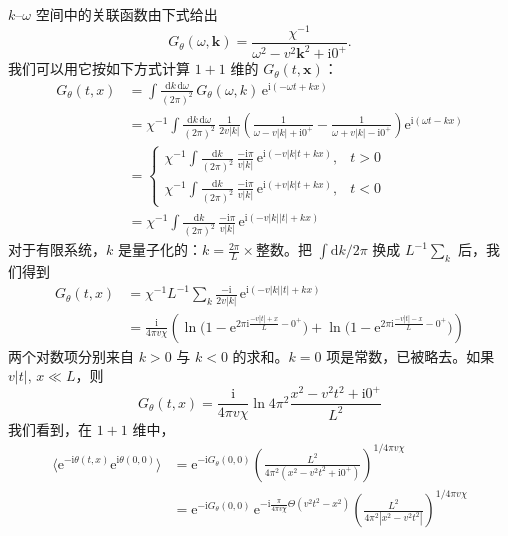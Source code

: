 $k$--$\omega$ 空间中的关联函数由下式给出
\begin{equation*}
G_{\theta}(\omega,\pmb{k})=\frac{\chi^{-1}}{\omega^2-v^2\pmb{k}^2+\mathrm{i}0^+}.
\end{equation*}
我们可以用它按如下方式计算 $1+1$ 维的 $G_{\theta}(t,\pmb{x})$：
\begin{align*}
G_{\theta}(t,x)&=\int\frac{\mathrm{d}k\,\mathrm{d}\omega}{(2\pi)^2}\,G_{\theta}(\omega,k)\,\mathrm{e}^{\mathrm{i}(-\omega t+kx)}\\
&=\chi^{-1}\int\frac{\mathrm{d}k\,\mathrm{d}\omega}{(2\pi)^2}\,\frac{1}{2v|k|}\left(\frac{1}{\omega-v|k|+\mathrm{i}0^+}-\frac{1}{\omega+v|k|-\mathrm{i}0^+}\right)\mathrm{e}^{\mathrm{i}(\omega t-kx)}\\
&=\left\{\begin{array}{ll}
\chi^{-1}\displaystyle\int\frac{\mathrm{d}k}{(2\pi)^2}\,\frac{-\mathrm{i}\pi}{v|k|}\,\mathrm{e}^{\mathrm{i}(-v|k|t+kx)}, & t>0\\[10pt]
\chi^{-1}\displaystyle\int\frac{\mathrm{d}k}{(2\pi)^2}\,\frac{-\mathrm{i}\pi}{v|k|}\,\mathrm{e}^{\mathrm{i}(+v|k|t+kx)}, & t<0
\end{array}\right.\\
&=\chi^{-1}\int\frac{\mathrm{d}k}{(2\pi)^2}\,\frac{-\mathrm{i}\pi}{v|k|}\,\mathrm{e}^{\mathrm{i}(-v|k||t|+kx)}
\end{align*}
对于有限系统，$k$ 是量子化的：$k=\frac{2\pi}{L}\times\text{整数}$。把 $\int\mathrm{d}k/2\pi$ 换成 $L^{-1}\sum_k$ 后，我们得到
\begin{align*}
G_{\theta}(t,x)&=\chi^{-1}L^{-1}\sum_k\frac{-\mathrm{i}}{2v|k|}\,\mathrm{e}^{\mathrm{i}(-v|k||t|+kx)}\\
&=\frac{\mathrm{i}}{4\pi v\chi}\left(\ln\big(1-\mathrm{e}^{2\pi\mathrm{i}\frac{-v|t|+x}{L}-0^+}\big)+\ln\big(1-\mathrm{e}^{2\pi\mathrm{i}\frac{-v|t|-x}{L}-0^+}\big)\right)
\end{align*}
两个对数项分别来自 $k>0$ 与 $k<0$ 的求和。$k=0$ 项是常数，已被略去。如果 $v|t|,\,x\ll L$，则
\begin{equation*}
G_{\theta}(t,x)=\frac{\mathrm{i}}{4\pi v\chi}\ln 4\pi^2\frac{x^2-v^2t^2+\mathrm{i}0^+}{L^2} \tag{3.3.24}
\end{equation*}
我们看到，在 $1+1$ 维中，
\begin{align*}
\big\langle\mathrm{e}^{-\mathrm{i}\theta(t,x)}\mathrm{e}^{\mathrm{i}\theta(0,0)}\big\rangle&=\mathrm{e}^{-\mathrm{i}G_{\theta}(0,0)}\left(\frac{L^2}{4\pi^2(x^2-v^2t^2+\mathrm{i}0^+)}\right)^{1/4\pi v\chi}\\
&=\mathrm{e}^{-\mathrm{i}G_{\theta}(0,0)}\,\mathrm{e}^{-\mathrm{i}\frac{\pi}{4\pi v\chi}\Theta(v^2t^2-x^2)}\left(\frac{L^2}{4\pi^2|x^2-v^2t^2|}\right)^{1/4\pi v\chi}
\end{align*}
